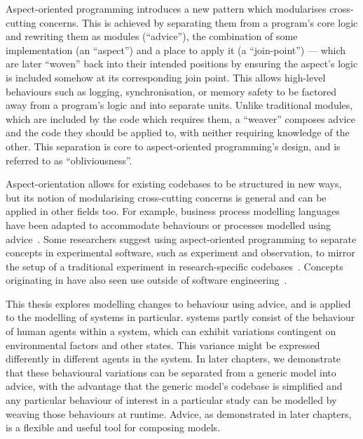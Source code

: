 Aspect-oriented programming introduces a new pattern which modularises
cross-cutting concerns. This is achieved by separating them from a program's
core logic and rewriting them as modules (``advice''), the combination of some
implementation (an ``aspect'') and a place to apply it (a ``join-point'')
 --- which are later ``woven'' back into their
intended positions by ensuring the aspect's logic is included somehow at its
corresponding join point. This allows high-level behaviours such as logging,
synchronisation, or memory safety to be factored away from a program's logic and
into separate units. Unlike traditional modules, which are included by the code
which requires them, a ``weaver'' composes advice and the code they should be
applied to, with neither requiring knowledge of the other. This separation is
core to aspect-oriented programming's design, and is referred to as
``obliviousness''.

Aspect-orientation allows for existing codebases to be structured in new ways,
but its notion of modularising cross-cutting concerns is general and can be
applied in other fields too. For example, business process modelling languages
have been adapted to accommodate behaviours or processes modelled using
advice~\cite{Cappelli_AOBPM,da2020implementation,charfi2007ao4bpel}. Some
researchers suggest using aspect-oriented programming to separate concepts in
experimental software, such as experiment and observation, to mirror the setup
of a traditional experiment in research-specific codebases~\cite{gulyas1999use}.
Concepts originating in \aop{} have also seen use outside of software
engineering~\cite{Cieslak_2011,Cappelli_AOBPM,da2020implementation,charfi2007ao4bpel}.

This thesis explores modelling changes to behaviour using advice, and is applied
to the modelling of \sociotechnical systems in particular. \Sociotechnical
systems partly consist of the behaviour of human agents within a system, which
can exhibit variations contingent on environmental factors and other states.
This variance might be expressed differently in different agents in the system.
In later chapters, we demonstrate that these behavioural variations can be
separated from a generic model into advice, with the advantage that the generic
model's codebase is simplified and any particular behaviour of interest in a
particular study can be modelled by weaving those behaviours at runtime. Advice,
as demonstrated in later chapters, is a flexible and useful tool for composing
models.



